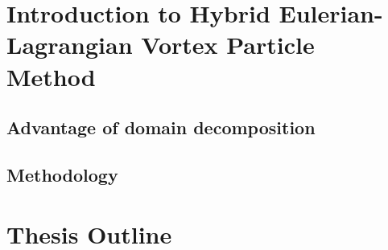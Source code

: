 
\section{Introduction to Hybrid Eulerian-Lagrangian Vortex Particle Method}


\subsection{Advantage of domain decomposition}


\subsection{Methodology}

\section{Thesis Outline}


%
%
%
%


